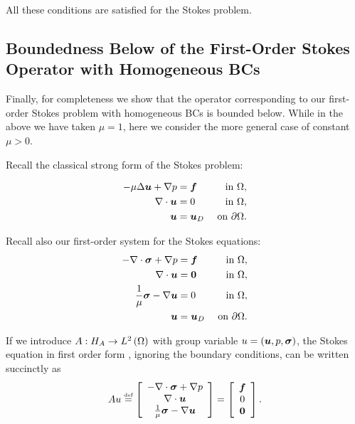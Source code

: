 All these conditions are satisfied for the Stokes problem.

\subsection{Boundedness Below of the First-Order Stokes Operator with Homogeneous BCs}
\label{sec:boundedness_below}
Finally, for completeness we show that the operator corresponding to our first-order Stokes problem with homogeneous BCs is bounded below.  While in the above we have taken $\mu=1$, here we consider the more general case of constant $\mu > 0$.

Recall the classical strong form of the Stokes problem:

\begin{align}
- \mu \Delta \vect{u} + \NVRgrad p &= \vect{f} & \text{ in } \Omega, \label{NVR:eq:strongfirst1} \\
\NVRdiv \vect{u} &= 0 & \text{ in } \Omega, \\
\vect{u} &= \vect{u}_D & \text{ on } \partial\Omega.\label{NVR:eq:stronglast1}
\end{align}

Recall also our first-order system for the Stokes equations:
\begin{subequations}
\eqnlab{StokesFirstOrder}
\begin{align}
- \NVRdiv \NVRtensor{\sigma} + \NVRgrad p &= \vect{f} & \text{ in
} \Omega, \label{NVR:eq:strongfirst2} \\ \NVRdiv \vect{u} &=
\NVRtensor{0} & \text{ in } \Omega, \\ \frac{1}{\mu}\NVRtensor{\sigma} - \NVRgrad
\vect{u} &= 0 & \text{ in } \Omega,\\ \vect{u} &= \vect{u}_D & \text{ on
} \partial\Omega.\label{NVR:eq:stronglast2}
\end{align}
\end{subequations}

If we introduce $\A : \HA \rightarrow \L$
with group variable $u = (\vect{u},p,\NVRtensor{\sigma})$,  the Stokes equation in first order form , ignoring the boundary conditions,
can be written succinctly as
\begin{align}
\A u \NVReqdef \left[\begin{array}{c}
- \NVRdiv \NVRtensor{\sigma} + \NVRgrad p\\
\NVRdiv \vect{u}\\
\frac{1}{\mu}\NVRtensor{\sigma} - \NVRgrad \vect{u}\end{array}\right]
= \left[\begin{array}{c}
\vect{f} \\
0 \\
\NVRtensor{0}
\end{array}\right].\label{NVR:eq:operatorAdefined}
\end{align}

